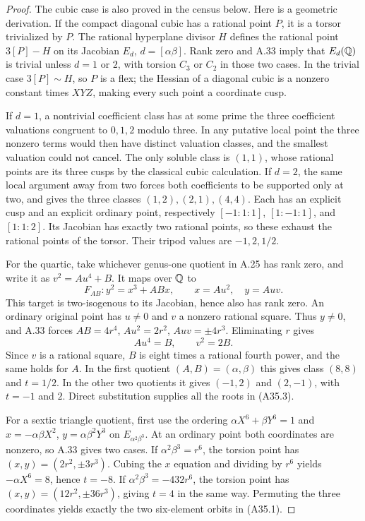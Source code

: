 \begin{proof}
The cubic case is also proved in the census below. Here is a geometric
derivation. If the compact diagonal cubic has a rational point $P$, it
is a torsor trivialized by $P$. The rational hyperplane divisor $H$ defines
the rational point $3[P]-H$ on its Jacobian $E_d$, $d=[\alpha\beta]$.
Rank zero and A.33 imply that $E_d(\mathbb Q)$ is trivial unless $d=1$ or $2$,
with torsion $C_3$ or $C_2$ in those two cases. In the trivial case
$3[P]\sim H$, so $P$ is a flex; the Hessian of a diagonal cubic is a
nonzero constant times $XYZ$, making every such point a coordinate cusp.

If $d=1$, a nontrivial coefficient class has at some prime the three
coefficient valuations congruent to $0,1,2$ modulo three. In any
putative local point the three nonzero terms would then have distinct
valuation classes, and the smallest valuation could not cancel.
The only soluble class is $(1,1)$, whose rational points are its three
cusps by the classical cubic calculation. If $d=2$, the same local
argument away from two forces both coefficients to be supported only
at two, and gives the three classes $(1,2),(2,1),(4,4)$.
Each has an explicit cusp and an explicit ordinary point, respectively
$[-1:1:1]$, $[1:-1:1]$, and $[1:1:2]$. Its Jacobian has exactly two
rational points, so these exhaust the rational points of the torsor.
Their tripod values are $-1,2,1/2$.

For the quartic, take whichever genus-one quotient in A.25 has rank zero,
and write it as $v^2=A u^4+B$. It maps over $\mathbb Q$ to
\[
F_{AB}:y^2=x^3+ABx,\qquad x=A u^2,\quad y=Auv.
\]
This target is two-isogenous to its Jacobian, hence also has rank zero.
An ordinary original point has $u\ne0$ and $v$ a nonzero rational
square. Thus $y\ne0$, and A.33 forces
$AB=4r^4$, $Au^2=2r^2$, $Auv=\pm4r^3$.
Eliminating $r$ gives
\[
A u^4=B,\qquad v^2=2B.
\]
Since $v$ is a rational square, $B$ is eight times a rational fourth
power, and the same holds for $A$. In the first quotient
$(A,B)=(\alpha,\beta)$ this gives class $(8,8)$ and $t=1/2$.
In the other two quotients it gives $(-1,2)$ and $(2,-1)$, with
$t=-1$ and $2$. Direct substitution supplies all the roots in (A35.3).

For a sextic triangle quotient, first use the ordering
$\alpha X^6+\beta Y^6=1$ and
$x=-\alpha\beta X^2$, $y=\alpha\beta^2Y^3$ on
$E_{\alpha^2\beta^3}$. At an ordinary point both coordinates are
nonzero, so A.33 gives two cases. If $\alpha^2\beta^3=r^6$,
the torsion point has $(x,y)=(2r^2,\pm3r^3)$. Cubing the $x$ equation
and dividing by $r^6$ yields $-\alpha X^6=8$, hence $t=-8$.
If $\alpha^2\beta^3=-432r^6$, the torsion point has
$(x,y)=(12r^2,\pm36r^3)$, giving $t=4$ in the same way.
Permuting the three coordinates yields exactly the two six-element
orbits in (A35.1).


\end{proof}
